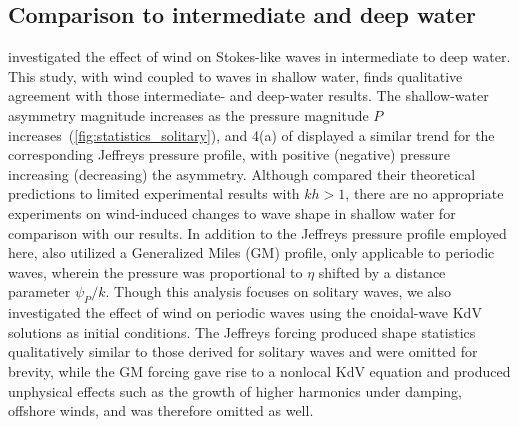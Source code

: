 \documentclass{jfm}
\begin{document}
\subsection{Comparison to intermediate and deep water}
 investigated the effect of
wind on Stokes-like waves in intermediate to deep water.
This study, with wind coupled to waves in shallow water, finds
qualitative agreement with those intermediate- and deep-water results.
The shallow-water asymmetry magnitude increases as the pressure
magnitude $P$ increases~(\cref{fig:statistics_solitary}), and \figname{}
4(a) of \citet{zdyrski2020wind} displayed a similar trend for the
corresponding Jeffreys pressure profile, with positive (negative)
pressure increasing (decreasing) the asymmetry.
Although \citet{zdyrski2020wind} compared their theoretical
predictions to limited experimental results with $kh > 1$, there are no
appropriate experiments on wind-induced changes to wave shape in shallow
water for comparison with our results.
In addition to the Jeffreys pressure profile employed here,
\citet{zdyrski2020wind} also utilized a Generalized Miles (GM) profile,
only applicable to periodic waves, wherein the pressure was proportional
to $\eta$ shifted by a distance parameter $\psi_P/k$.
Though this analysis focuses on solitary waves, we also investigated the
effect of wind on periodic waves using the cnoidal-wave KdV solutions as
initial conditions.
The Jeffreys forcing produced shape statistics qualitatively
similar to those derived for solitary waves and were omitted for
brevity, while the GM forcing gave rise to a nonlocal KdV equation and
produced unphysical effects such as the growth of higher harmonics under
damping, offshore winds, and was therefore omitted as well.
\end{document}
